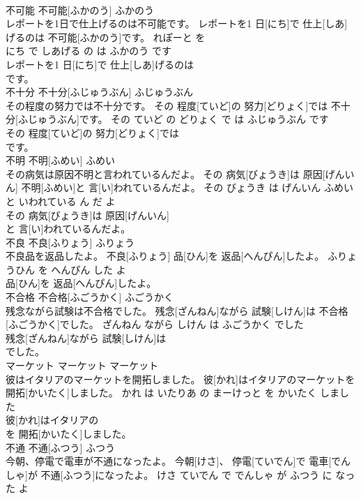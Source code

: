 \documentclass[8pt]{extreport}
\begin{document}
\begin{CJK}{UTF8}{min}
\\	不可能	不可能[ふかのう]	ふかのう	
\\	レポートを1日で仕上げるのは不可能です。	レポートを1 日[にち]で 仕上[しあ]げるのは 不可能[ふかのう]です。	れぽーと を 
\\	にち で しあげる の は ふかのう です	
\\	レポートを1 日[にち]で 仕上[しあ]げるのは
\\	です。			
\\	不十分	不十分[ふじゅうぶん]	ふじゅうぶん	
\\	その程度の努力では不十分です。	その 程度[ていど]の 努力[どりょく]では 不十分[ふじゅうぶん]です。	その ていど の どりょく で は ふじゅうぶん です	
\\	その 程度[ていど]の 努力[どりょく]では
\\	です。			
\\	不明	不明[ふめい]	ふめい	
\\	その病気は原因不明と言われているんだよ。	その 病気[びょうき]は 原因[げんいん] 不明[ふめい]と 言[い]われているんだよ。	その びょうき は げんいん ふめい と いわれている ん だ よ	
\\	その 病気[びょうき]は 原因[げんいん]
\\	と 言[い]われているんだよ。			
\\	不良	不良[ふりょう]	ふりょう	
\\	不良品を返品したよ。	不良[ふりょう] 品[ひん]を 返品[へんぴん]したよ。	ふりょうひん を へんぴん した よ	
\\	品[ひん]を 返品[へんぴん]したよ。			
\\	不合格	不合格[ふごうかく]	ふごうかく	
\\	残念ながら試験は不合格でした。	残念[ざんねん]ながら 試験[しけん]は 不合格[ふごうかく]でした。	ざんねん ながら しけん は ふごうかく でした	
\\	残念[ざんねん]ながら 試験[しけん]は
\\	でした。			
\\	マーケット	マーケット	マーケット	
\\	彼はイタリアのマーケットを開拓しました。	彼[かれ]はイタリアのマーケットを 開拓[かいたく]しました。	かれ は いたりあ の まーけっと を かいたく しました	
\\	彼[かれ]はイタリアの
\\	を 開拓[かいたく]しました。			
\\	不通	不通[ふつう]	ふつう	
\\	今朝、停電で電車が不通になったよ。	今朝[けさ]、 停電[ていでん]で 電車[でんしゃ]が 不通[ふつう]になったよ。	けさ ていでん で でんしゃ が ふつう に なった よ	

\end{CJK}
\end{document}
